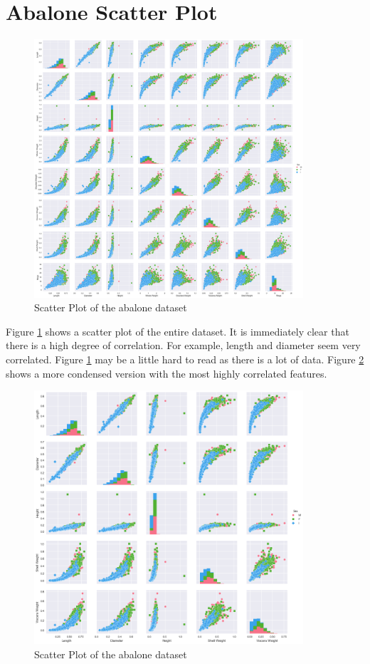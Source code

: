 \section{Abalone Scatter Plot}

\begin{figure}[H]
  \centering
  \includegraphics[scale=0.5,width=100mm]{./images/abalone-scatter-plot.png}
  \caption{Scatter Plot of the abalone dataset}
  \label{fig:abalones-scatter-plot}
\end{figure}

Figure \ref{fig:abalones-scatter-plot} shows a scatter plot of the entire dataset. It is immediately clear that there is a high degree of correlation. For example, length and diameter seem very correlated. Figure \ref{fig:abalones-scatter-plot} may be a little hard to read as there is a lot of data. Figure \ref{fig:abalones-scatter-plot-condensed} shows a more condensed version with the most highly correlated features.

\begin{figure}[H]
  \centering
  \includegraphics[scale=0.5,width=100mm]{./images/abalone-scatter-plot-condensed.png}
  \caption{Scatter Plot of the abalone dataset}
  \label{fig:abalones-scatter-plot-condensed}
\end{figure}

